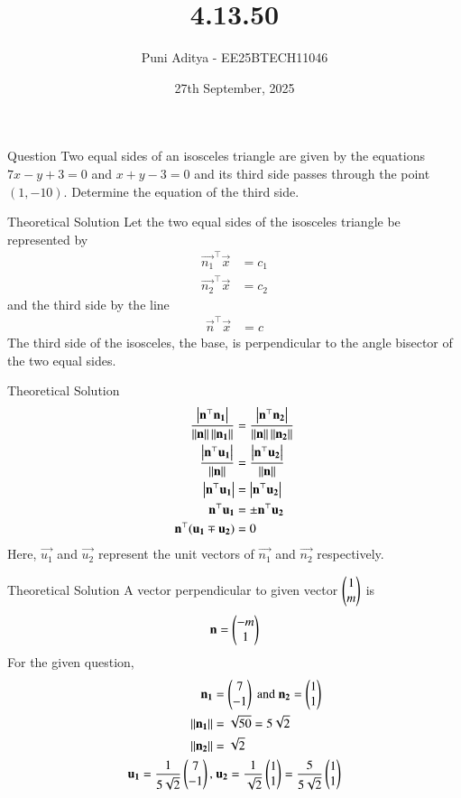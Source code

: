 \documentclass{beamer}
\title{4.13.50}
\date{27th September, 2025}
\author{Puni Aditya - EE25BTECH11046}
\begin{document}
\frame{\titlepage}
\begin{frame}{Question}
Two equal sides of an isosceles triangle are given by the equations $7x - y + 3 = 0$ and $x + y - 3 = 0$ and its third side passes through the point $(1, -10)$. Determine the equation of the third side.
\end{frame}

\begin{frame}{Theoretical Solution}
Let the two equal sides of the isosceles triangle be represented by
\begin{align*}
    \vec{n_1}^\top\vec{x} &= c_1 \\
    \vec{n_2}^\top\vec{x} &= c_2
\end{align*}
and the third side by the line
\begin{align*}
    \vec{n}^\top\vec{x} &= c
\end{align*}
The third side of the isosceles, the base, is perpendicular to the angle bisector of the two equal sides.
\end{frame}

\begin{frame}{Theoretical Solution}
\begin{align}
    \frac{\left\vert\mathbf{n}^\top\mathbf{n_1}\right\vert}{\left\lVert\mathbf{n}\right\rVert\left\lVert\mathbf{n_1}\right\rVert} &= \frac{\left\vert\mathbf{n}^\top\mathbf{n_2}\right\vert}{\left\lVert\mathbf{n}\right\rVert\left\lVert\mathbf{n_2}\right\rVert} \\
    \frac{\left\vert\mathbf{n}^\top\mathbf{u_1}\right\vert}{\left\lVert\mathbf{n}\right\rVert} &= \frac{\left\vert\mathbf{n}^\top\mathbf{u_2}\right\vert}{\left\lVert\mathbf{n}\right\rVert} \\
    \left\vert\mathbf{n}^\top\mathbf{u_1}\right\vert &= \left\vert\mathbf{n}^\top\mathbf{u_2}\right\vert \\
    \mathbf{n}^\top\mathbf{u_1} &= \pm \mathbf{n}^\top\mathbf{u_2} \\
    \mathbf{n}^\top(\mathbf{u_1} \mp \mathbf{u_2}) &= 0
\end{align}
Here, $\vec{u_1}$ and $\vec{u_2}$ represent the unit vectors of $\vec{n_1}$ and $\vec{n_2}$ respectively.
\end{frame}

\begin{frame}{Theoretical Solution}
A vector perpendicular to given vector $\begin{pmatrix}1 \\ m\end{pmatrix}$ is
\begin{align}
    \mathbf{n} = \begin{pmatrix}-m \\ 1\end{pmatrix} \label{eq:40}
\end{align}
For the given question,
\begin{align}
    \mathbf{n_1} &= \begin{pmatrix}7 \\ -1\end{pmatrix}\text{ and }\mathbf{n_2} = \begin{pmatrix}1 \\ 1\end{pmatrix} \\
    \left\lVert\mathbf{n_1}\right\rVert &= \sqrt{50} = 5\sqrt{2} \\
    \left\lVert\mathbf{n_2}\right\rVert &= \sqrt{2} \\
    \mathbf{u_1} = \frac{1}{5\sqrt{2}}\begin{pmatrix}7 \\ -1\end{pmatrix},&\text{ }\mathbf{u_2} = \frac{1}{\sqrt{2}}\begin{pmatrix}1 \\ 1\end{pmatrix} = \frac{5}{5\sqrt{2}}\begin{pmatrix}1 \\ 1\end{pmatrix}
\end{align}
\end{frame}
\end{document}
